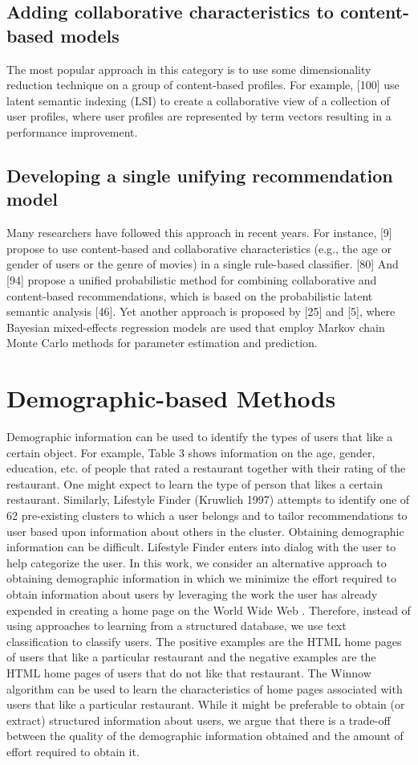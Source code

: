 \subsection{Adding collaborative characteristics to content-based models}
The most popular approach in this category is to use some dimensionality reduction technique on a group of content-based profiles. For example, [100] use latent semantic indexing (LSI) to create a collaborative view of a collection of user profiles, where user profiles are represented by term vectors  resulting in a performance improvement.

\subsection{Developing a single unifying recommendation model}
Many researchers have followed this approach in recent years. For instance, [9] propose to use content-based and collaborative characteristics (e.g., the age or gender of users or the genre of movies) in a single rule-based classifier. [80] And [94] propose a unified probabilistic method for combining collaborative and content-based recommendations, which is based on the probabilistic latent semantic analysis [46]. Yet another approach is proposed by [25] and [5], where Bayesian mixed-effects regression models are used that employ Markov chain Monte Carlo methods for parameter estimation and prediction.

\section{Demographic-based Methods}
Demographic information can be used to identify the types of users that like a certain object. For example, Table 3 shows information on the age, gender, education, etc. of people that rated a restaurant together with their rating of the restaurant. One might expect to learn the type of person that likes a certain restaurant. Similarly, Lifestyle Finder (Kruwlich 1997) attempts to identify one of 62 pre-existing clusters to which a user belongs and to tailor recommendations to user based upon information about others in the cluster. Obtaining demographic information can be difficult. Lifestyle Finder enters into dialog with the user to help categorize the user.
In this work, we consider an alternative approach to obtaining demographic information in which we minimize the effort required to obtain information about users by leveraging the work the user has already expended in creating a home page on the World Wide Web . Therefore, instead of using approaches to learning from a structured database, we use text classification to classify users. The positive examples are the HTML home pages of users that like a particular restaurant and the negative examples are the HTML home pages of users that do not like that restaurant. The Winnow algorithm can be used to learn the characteristics of home pages associated with users that like a particular restaurant. While it might be preferable to obtain (or extract) structured information about users, we argue that there is a trade-off between the quality of the demographic information obtained and the amount of effort required to obtain it.

